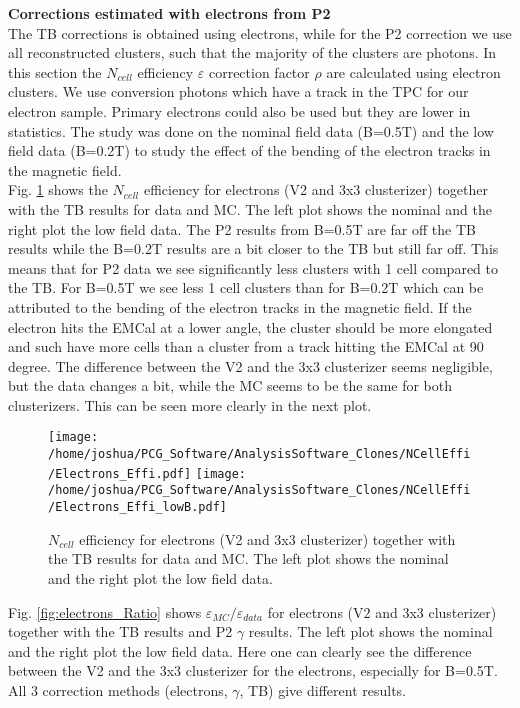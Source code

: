 \documentclass[ALICE]{ALICE_analysis_notes}
\begin{document}
\textbf{Corrections estimated with electrons from P2}\\
The TB corrections is obtained using electrons, while for the P2 correction we use all reconstructed clusters, such that the majority of the clusters are photons.
In this section the $N_{cell}$ efficiency $\varepsilon$ correction factor $\rho$ are calculated using electron clusters. We use conversion photons which have a track in the TPC for our electron sample. Primary electrons could also be used but they are lower in statistics. The study was done on the nominal field data (B=0.5T) and the low field data (B=0.2T) to study the effect of the bending of the electron tracks in the magnetic field.\\
Fig. \ref{fig:electrons_Effi} shows the $N_{cell}$ efficiency for electrons (V2 and 3x3 clusterizer) together with the TB results for data and MC. The left plot shows the nominal and the right plot the low field data. The P2 results from B=0.5T are far off the TB results while the B=0.2T results are a bit closer to the TB but still far off. This means that for P2 data we see significantly less clusters with 1 cell compared to the TB. For B=0.5T we see less 1 cell clusters than for B=0.2T which can be attributed to the bending of the electron tracks in the magnetic field. If the electron hits the EMCal at a lower angle, the cluster should be more elongated and such have more cells than a cluster from a track hitting the EMCal at 90 degree.
The difference between the V2 and the 3x3 clusterizer seems negligible, but the data changes a bit, while the MC seems to be the same for both clusterizers. This can be seen more clearly in the next plot.


\begin{figure}[h!]
	\centering
	\texttt{[image: /home/joshua/PCG\_Software/AnalysisSoftware\_Clones/NCellEffi/Electrons\_Effi.pdf]}	
	\texttt{[image: /home/joshua/PCG\_Software/AnalysisSoftware\_Clones/NCellEffi/Electrons\_Effi\_lowB.pdf]}
	
	\caption{ $N_{cell}$ efficiency for electrons (V2 and 3x3 clusterizer) together with the TB results for data and MC. The left plot shows the nominal and the right plot the low field data.   }
	\label{fig:electrons_Effi}
\end{figure}


Fig. \ref{fig:electrons_Ratio} shows $\varepsilon_{MC}/\varepsilon_{data}$ for electrons (V2 and 3x3 clusterizer) together with the TB results and P2 $\gamma$ results. The left plot shows the nominal and the right plot the low field data.
Here one can clearly see the difference between the V2 and the 3x3 clusterizer for the electrons, especially for B=0.5T. All 3 correction methods (electrons, $\gamma$, TB) give different results.
\end{document}
